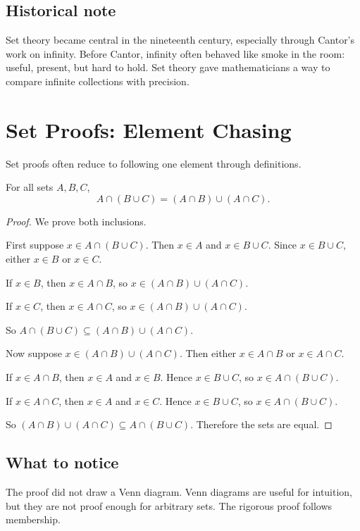 \documentclass[11pt]{article}
\begin{document}
\subsection{Historical note}

Set theory became central in the nineteenth century, especially through Cantor's work on infinity. Before Cantor, infinity often behaved like smoke in the room: useful, present, but hard to hold. Set theory gave mathematicians a way to compare infinite collections with precision.

\newpage
\section{Set Proofs: Element Chasing}

Set proofs often reduce to following one element through definitions.

\begin{theorem}
For all sets $A,B,C$,
\[
A\cap(B\cup C)=(A\cap B)\cup(A\cap C).
\]
\end{theorem}

\begin{proof}
We prove both inclusions.

First suppose $x\in A\cap(B\cup C)$. Then $x\in A$ and $x\in B\cup C$. Since $x\in B\cup C$, either $x\in B$ or $x\in C$.

If $x\in B$, then $x\in A\cap B$, so $x\in (A\cap B)\cup(A\cap C)$.

If $x\in C$, then $x\in A\cap C$, so $x\in (A\cap B)\cup(A\cap C)$.

So $A\cap(B\cup C)\subseteq (A\cap B)\cup(A\cap C)$.

Now suppose $x\in (A\cap B)\cup(A\cap C)$. Then either $x\in A\cap B$ or $x\in A\cap C$.

If $x\in A\cap B$, then $x\in A$ and $x\in B$. Hence $x\in B\cup C$, so $x\in A\cap(B\cup C)$.

If $x\in A\cap C$, then $x\in A$ and $x\in C$. Hence $x\in B\cup C$, so $x\in A\cap(B\cup C)$.

So $(A\cap B)\cup(A\cap C)\subseteq A\cap(B\cup C)$. Therefore the sets are equal.
\end{proof}

\subsection{What to notice}

The proof did not draw a Venn diagram. Venn diagrams are useful for intuition, but they are not proof enough for arbitrary sets. The rigorous proof follows membership.
\end{document}

